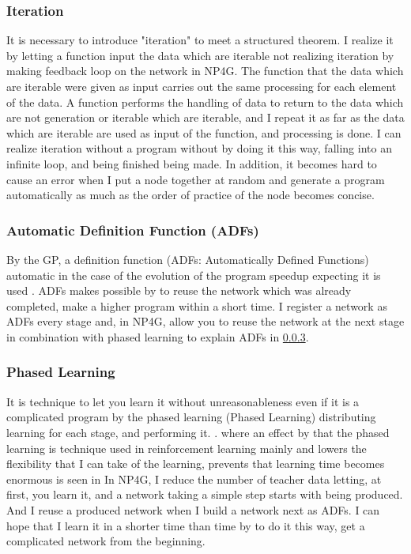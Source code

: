 \documentclass{article}
\begin{document}
\subsubsection {Iteration}
It is necessary to introduce "iteration" to meet a structured theorem.
I realize it by letting a function input the data which are iterable not realizing iteration by making feedback loop on the network in NP4G.
The function that the data which are iterable were given as input carries out the same processing for each element of the data.
A function performs the handling of data to return to the data which are not generation or iterable which are iterable, and I repeat it as far as the data which are iterable are used as input of the function, and processing is done.
I can realize iteration without a program without by doing it this way, falling into an infinite loop, and being finished being made.
In addition, it becomes hard to cause an error when I put a node together at random and generate a program automatically as much as the order of practice of the node becomes concise.
\subsubsection {Automatic Definition Function (ADFs)}
By the GP, a definition function (ADFs: Automatically Defined Functions) automatic in the case of the evolution of the program speedup expecting it is used \cite{adfs}.
ADFs makes possible by to reuse the network which was already completed, make a higher program within a short time.
I register a network as ADFs every stage and, in NP4G, allow you to reuse the network at the next stage in combination with phased learning to explain ADFs in \ref{sec:PL}.
\subsubsection {Phased Learning}
\label{sec:PL}
It is technique to let you learn it without unreasonableness even if it is a complicated program by the phased learning (Phased Learning) distributing learning for each stage, and performing it.
\cite{hodohara2012reinforcement}. where an effect by that the phased learning is technique used in reinforcement learning mainly and lowers the flexibility that I can take of the learning, prevents that learning time becomes enormous is seen in
In NP4G, I reduce the number of teacher data letting, at first, you learn it, and a network taking a simple step starts with being produced.
And I reuse a produced network when I build a network next as ADFs.
I can hope that I learn it in a shorter time than time by to do it this way, get a complicated network from the beginning.
\end{document}

